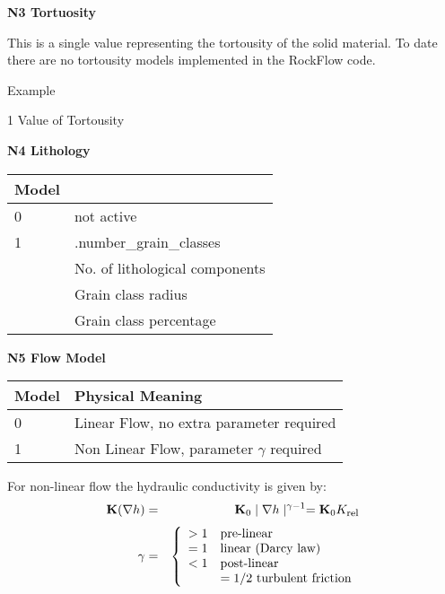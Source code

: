 \normalsize

\textbf{N3  Tortuosity} \vspace{0.5cm}

This is a single value representing the tortousity of the solid
material. To date there are no tortousity models implemented in
the RockFlow code.

Example

1  Value of Tortousity

\vspace{0.5cm}

\textbf{N4  Lithology} \vspace{0.5cm}


\begin{tabular}{l|l}
Model & \\
\hline
%
0 & not active \\
1   & .number\_grain\_classes\\
    &No. of lithological components\\
    &Grain class radius\\
    &Grain class percentage\\
\end{tabular}
\vspace{0.5cm}

\textbf{N5  Flow Model}

\begin{tabular}{l|l}
Model & Physical Meaning\\
\hline
%
0 & Linear Flow, no extra parameter required \\
1 & Non Linear Flow, parameter $\gamma$ required  \\

\end{tabular}

\vspace{0.5cm}

For non-linear flow the hydraulic conductivity is given
by:
\begin{eqnarray}
{\bf K} (\nabla h) &=& {\bf K}_0 \mid\nabla h \mid^{\gamma -1} =
{\bf K}_0 K_{\mbox{\footnotesize rel}}
\\[3pt]
\gamma &=& \left\lbrace
\begin{array}{ll}
> 1 & \mbox{pre-linear}
\\
= 1 & \mbox{linear (Darcy law)}
\\
< 1 & \mbox{post-linear}
\\
    & = 1/2 \mbox{ turbulent friction}
\end{array}
\right.
\end{eqnarray}

